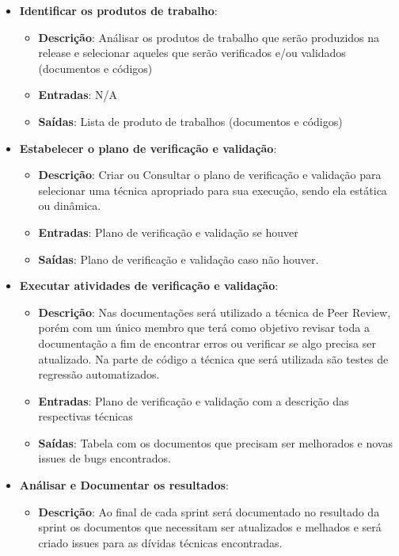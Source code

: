 \begin{itemize}
  \item \textbf{Identificar os produtos de trabalho}:
  \begin{itemize}
    \item \textbf{Descrição}: Análisar os produtos de trabalho que serão produzidos na release e selecionar
      aqueles que serão verificados e/ou validados (documentos e códigos)
    \item \textbf{Entradas}: N/A
    \item \textbf{Saídas}: Lista de produto de trabalhos (documentos e códigos)
  \end{itemize}
  \item \textbf{Estabelecer o plano de verificação e validação}:
  \begin{itemize}
    \item \textbf{Descrição}: Criar ou Consultar o plano de verificação e validação para selecionar uma técnica apropriado
    para sua execução, sendo ela estática ou dinâmica.
    \item \textbf{Entradas}: Plano de verificação e validação se houver
    \item \textbf{Saídas}: Plano de verificação e validação caso não houver.
  \end{itemize}
  \item \textbf{Executar atividades de verificação e validação}:
  \begin{itemize}
    \item \textbf{Descrição}: Nas documentações será utilizado a técnica de Peer Review, porém com um único membro
      que terá como objetivo revisar toda a documentação a fim de encontrar erros ou verificar se algo precisa ser
      atualizado. Na parte de código a técnica que será utilizada são testes de regressão automatizados.
    \item \textbf{Entradas}: Plano de verificação e validação com a descrição das respectivas técnicas
    \item \textbf{Saídas}: Tabela com os documentos que precisam ser melhorados e novas issues de bugs encontrados.
  \end{itemize}
  \item \textbf{Análisar e Documentar os resultados}:
  \begin{itemize}
    \item \textbf{Descrição}: Ao final de cada sprint será documentado no resultado da sprint os documentos que necessitam
    ser atualizados e melhados e será criado issues para as dívidas técnicas encontradas.

\end{itemize}
\end{itemize}
